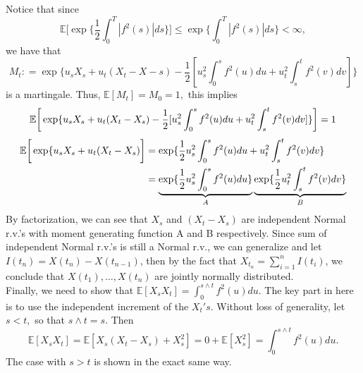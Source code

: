 \documentclass[11pt]{article}
\newcommand{\ex}{{\mathbb E}}
\begin{document}
\begin{enumerate}
Notice that since \[ \ex[{\exp\{\frac{1}{2} \int_{0}^{T} |f^2(s)| ds\}] \leq \exp \{\int_{0}^{T} |f^2(s)| ds\} < \infty}, \] we have that \[ M_t : = \exp \{ u_s X_s + u_t (X_t-X-s) - \frac{1}{2} [u^2_s \int_{0}^{s} f^2 (u) du + u^2_t \int_{s}^{t} f^2(v) dv]\} \]
is a martingale. Thus, $\ex[M_t] = M_0 = 1,$ this implies
\[\ex\bigg{[}  \exp \{ u_s X_s + u_t (X_t-X_s) - \frac{1}{2} [u^2_s \int_{0}^{s} f^2 (u) du + u^2_t \int_{s}^{t} f^2(v) dv]\}  \bigg{]}= 1\]
\begin{align*}
\ex\bigg{[}  \exp \{ u_s X_s + u_t (X_t-X_s)\bigg{]}& = \exp\{  \frac{1}{2} u^2_s \int_{0}^{s} f^2 (u) du + u^2_t \int_{s}^{t} f^2(v) dv\}\\
& = \underbrace{\exp\{ \frac{1}{2} u^2_s \int_{0}^{s} f^2 (u) du\} }_{A} \underbrace{\exp \{ \frac{1}{2} u^2_t \int_{s}^{t} f^2 (v) dv\}}_{B}  
\end{align*}
By factorization, we can see that $X_s$ and $(X_t-X_s)$ are independent Normal r.v.'s with moment generating function A and B respectively. Since sum of independent Normal r.v.'s is still a Normal r.v., we can generalize and let $I(t_n) = X(t_n) - X(t_{n-1})$, then by the fact that $X_{t_n} = \sum_{i=1}^{n} I(t_i)$, we conclude that $X(t_1),\dots, X(t_n)$ are jointly normally distributed.
\\
Finally, we need to show that $\ex[X_sX_t] = \int_{0}^{s\wedge t} f^2(u) du.$ The key part in here is to use the independent increment of the $X_t's.$ Without loss of generality, let $s < t, $ so that $s\wedge t = s$. Then 
\[
\ex[X_s X_t]  = \ex[X_s (X_t -X_s) + X_s^2] = 0 + \ex[X^2_s] = \int_{0}^{s\wedge t} f^2(u) du.
\]
The case with $s > t$ is shown in the exact same way.
\end{enumerate}
\end{document}

